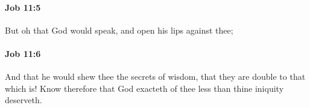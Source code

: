 		\paragraph{Job 11:5} %
			\label{JOB-11-5}

			But oh that God would speak, and open his lips against thee;


		\paragraph{Job 11:6} %
			\label{JOB-11-6}

			And that he would shew thee the secrets of wisdom, that they are double to that which is! Know therefore that God exacteth of thee less than thine iniquity deserveth.


